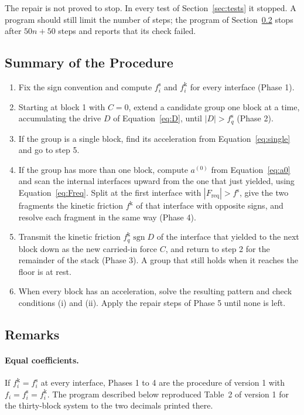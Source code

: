 \documentclass[11pt,a4paper]{article}
\newcommand{\fs}{f^{\mathrm{s}}}
\newcommand{\fkin}{f^{\mathrm{k}}}
\DeclareMathOperator{\sgn}{sgn}
\newcommand{\Freq}{F_{\mathrm{req}}}
\begin{document}
The repair is not proved to stop. In every test of Section~\ref{sec:tests} it stopped. A program should still limit the number of steps; the program of Section~\ref{sec:remarks} stops after $50n+50$ steps and reports that its check failed.

\subsection{Summary of the Procedure}

\begin{enumerate}
\item Fix the sign convention and compute $\fs_i$ and $\fkin_i$ for every interface (Phase 1).
\item Starting at block 1 with $C=0$, extend a candidate group one block at a time, accumulating the drive $D$ of Equation~\eqref{eq:D}, until $|D|>\fs_q$ (Phase 2).
\item If the group is a single block, find its acceleration from Equation~\eqref{eq:single} and go to step 5.
\item If the group has more than one block, compute $a^{(0)}$ from Equation~\eqref{eq:a0} and scan the internal interfaces upward from the one that just yielded, using Equation~\eqref{eq:Freq}. Split at the first interface with $|\Freq|>\fs$, give the two fragments the kinetic friction $\fkin$ of that interface with opposite signs, and resolve each fragment in the same way (Phase 4).
\item Transmit the kinetic friction $\fkin_q\sgn D$ of the interface that yielded to the next block down as the new carried-in force $C$, and return to step 2 for the remainder of the stack (Phase 3). A group that still holds when it reaches the floor is at rest.
\item When every block has an acceleration, solve the resulting pattern and check conditions (i) and (ii). Apply the repair steps of Phase 5 until none is left.
\end{enumerate}

\subsection{Remarks}\label{sec:remarks}

\paragraph{Equal coefficients.} If $\fkin_i=\fs_i$ at every interface, Phases 1 to 4 are the procedure of version 1 with $f_i=\fs_i=\fkin_i$. The program described below reproduced Table~2 of version 1 for the thirty-block system to the two decimals printed there.
\end{document}
